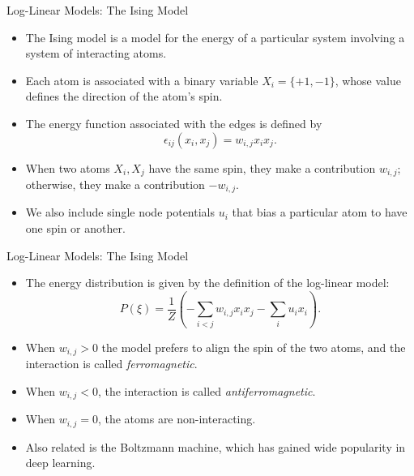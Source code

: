 \documentclass[11pt]{beamer}
\begin{document}
\begin{frame}{Log-Linear Models: The Ising Model}
\begin{itemize}
	\item The Ising model is a model for the energy of a particular system
	involving a system of interacting atoms.
	\item Each atom is associated with a binary variable $X_{i} = \{+1,
	-1\}$, whose value defines the direction of the atom's spin.
	\item The energy function associated with the edges is defined by
	\[
		\epsilon_{ij}(x_{i}, x_{j}) = w_{i,j}x_{i}x_{j}.
	\]
	\item When two atoms $X_{i},X_{j}$ have the same spin, they make a
	contribution $w_{i,j}$; otherwise, they make a contribution $-w_{i,j}$.
	\item We also include single node potentials $u_{i}$ that bias a
	particular atom to have one spin or another.
\end{itemize}
\end{frame}

\begin{frame}{Log-Linear Models: The Ising Model}
\begin{itemize}
	\item The energy distribution is given by the definition of the
	log-linear model:
	\[
		P(\xi) = \frac{1}{Z}\left(-\sum_{i<j}w_{i,j}x_{i}x_{j} -
		\sum_{i}u_{i}x_{i}\right).
	\]
	\item When $w_{i,j} > 0$ the model prefers to align the spin of the two
	atoms, and the interaction is called \emph{ferromagnetic}.
	\item When $w_{i,j} < 0$, the interaction is called
	\emph{antiferromagnetic}.
	\item When $w_{i,j} = 0$, the atoms are non-interacting.
	\item Also related is the Boltzmann machine, which has gained wide
	popularity in deep learning.
\end{itemize}
\end{frame}

\newcommand{\isingmodel}
{
	\begin{tikzpicture}
	\scriptsize
	\foreach \x in {0,...,4}
	\foreach \y in {0,...,4}
	{
		\pgfmathtruncatemacro{\r}{5-\y}
		\pgfmathtruncatemacro{\c}{\x+1}
		\node[darkstyle] (\x\y) at (1.5*\x,1.5*\y) {$A_{\r,\c}$};
	}
	\foreach \x in {0,...,4}
	\foreach \y [count=\yi] in {0,...,3}
	\draw (\x\y)--(\x\yi) (\y\x)--(\yi\x);
	\end{tikzpicture}
}
\end{document}
